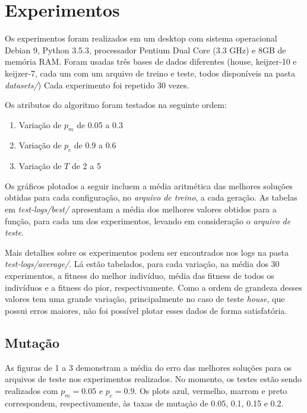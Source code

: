 \documentclass[11pt]{article}
\begin{document}
\section{Experimentos}

Os experimentos foram realizados em um desktop com sistema operacional Debian 9, Python 3.5.3, processador Pentium Dual Core (3.3 GHz) e 8GB de memória RAM. Foram usadas três bases de dados diferentes (house, keijzer-10 e keijzer-7, cada um com um arquivo de treino e teste, todos disponíveis na pasta \textit{datasets/}) Cada experimento foi repetido 30 vezes.

Os atributos do algoritmo foram testados na seguinte ordem:

\begin{enumerate}
	\item Variação de $p_m$ de 0.05 a 0.3
	\item Variação de $p_c$ de 0.9 a 0.6
	\item Variação de $T$ de 2 a 5
\end{enumerate}

Os gráficos plotados a seguir incluem a média aritmética das melhores soluções obtidas para cada configuração, no \textit{arquivo de treino}, a cada geração. As tabelas em \textit{test-logs/best/} apresentam a média dos melhores valores obtidos para a função, para cada um dos experimentos, levando em consideração o \textit{arquivo de teste}.

Mais detalhes sobre os experimentos podem ser encontrados nos logs na pasta \textit{test-logs/average/}. Lá estão tabelados, para cada variação, na média dos 30 experimentos, a fitness do melhor indivíduo, média das fitness de todos os indivíduos e a fitness do pior, respectivamente. Como a ordem de grandeza desses valores tem uma grande variação, principalmente no caso de teste \textit{house}, que possui erros maiores, não foi possível plotar esses dados de forma satisfatória.

\subsection{Mutação}

As figuras de 1 a 3 demonstram a média do erro das melhores soluções para os arquivos de teste nos experimentos realizados. No momento, os testes estão sendo realizados com $p_m = 0.05$ e $p_c = 0.9$. Os plots azul, vermelho, marrom e preto correspondem, respectivamente, às taxas de mutação de 0.05, 0.1, 0.15 e 0.2.
\end{document}
